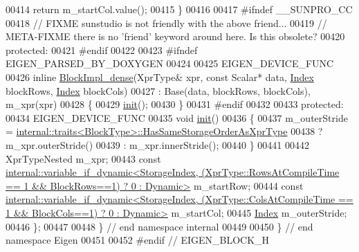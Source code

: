 \begin{DoxyCode}
00414       \textcolor{keywordflow}{return} m\_startCol.value();
00415     \}
00416 
00417 \textcolor{preprocessor}{  #ifndef \_\_SUNPRO\_CC}
00418   \textcolor{comment}{// FIXME sunstudio is not friendly with the above friend...}
00419   \textcolor{comment}{// META-FIXME there is no 'friend' keyword around here. Is this obsolete?}
00420   \textcolor{keyword}{protected}:
00421 \textcolor{preprocessor}{  #endif}
00422 
00423 \textcolor{preprocessor}{    #ifndef EIGEN\_PARSED\_BY\_DOXYGEN}
00424 
00425     EIGEN\_DEVICE\_FUNC
00426     \textcolor{keyword}{inline} \hyperlink{class_eigen_1_1internal_1_1_block_impl__dense}{BlockImpl\_dense}(XprType& xpr, \textcolor{keyword}{const} Scalar* data, 
      \hyperlink{namespace_eigen_a62e77e0933482dafde8fe197d9a2cfde}{Index} blockRows, \hyperlink{namespace_eigen_a62e77e0933482dafde8fe197d9a2cfde}{Index} blockCols)
00427       : Base(data, blockRows, blockCols), m\_xpr(xpr)
00428     \{
00429       \hyperlink{structinit}{init}();
00430     \}
00431 \textcolor{preprocessor}{    #endif}
00432 
00433   \textcolor{keyword}{protected}:
00434     EIGEN\_DEVICE\_FUNC
00435     \textcolor{keywordtype}{void} \hyperlink{structinit}{init}()
00436     \{
00437       m\_outerStride = \hyperlink{struct_eigen_1_1internal_1_1traits}{internal::traits<BlockType>::HasSameStorageOrderAsXprType}
00438                     ? m\_xpr.outerStride()
00439                     : m\_xpr.innerStride();
00440     \}
00441 
00442     XprTypeNested m\_xpr;
00443     \textcolor{keyword}{const} 
      \hyperlink{class_eigen_1_1internal_1_1variable__if__dynamic}{internal::variable\_if\_dynamic<StorageIndex, (XprType::RowsAtCompileTime == 1 && BlockRows==1) ? 0 :
       Dynamic>}
       m\_startRow;
00444     \textcolor{keyword}{const} 
      \hyperlink{class_eigen_1_1internal_1_1variable__if__dynamic}{internal::variable\_if\_dynamic<StorageIndex, (XprType::ColsAtCompileTime == 1 && BlockCols==1) ? 0 :
       Dynamic>}
       m\_startCol;
00445     \hyperlink{namespace_eigen_a62e77e0933482dafde8fe197d9a2cfde}{Index} m\_outerStride;
00446 \};
00447 
00448 \} \textcolor{comment}{// end namespace internal}
00449 
00450 \} \textcolor{comment}{// end namespace Eigen}
00451 
00452 \textcolor{preprocessor}{#endif // EIGEN\_BLOCK\_H}
\end{DoxyCode}
